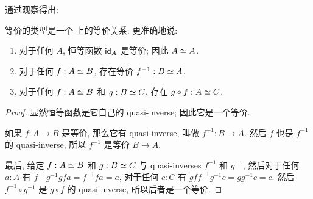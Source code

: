 通过观察得出:

\begin{lem}
    \label{thm:equiv-eqrel}
    等价的类型是一个 \type 上的等价关系.
    更准确地说:
    \begin{enumerate}
        \item 对于任何 $A$, 恒等函数 $\idfunc[A]$ 是等价; 因此 $\eqv A A$.
        \item 对于任何 $f:\eqv A B$, 存在等价 $f^{-1} : \eqv B A$.
        \item 对于任何 $f:\eqv A B$ 和 $g:\eqv B C$, 存在 $g\circ f : \eqv A C$.
    \end{enumerate}
\end{lem}
\begin{proof}
  显然恒等函数是它自己的 quasi-inverse; 因此它是一个等价.

  如果 $f:A\to B$ 是等价, 那么它有 quasi-inverse, 叫做 $f^{-1}:B\to A$.
  然后 $f$ 也是 $f^{-1}$ 的 quasi-inverse, 所以 $f^{-1}$ 是等价 $B\to A$.

  最后, 给定 $f:\eqv A B$ 和 $g:\eqv B C$ 与 quasi-inverses $f^{-1}$ 和 $g^{-1}$, 然后对于任何 $a:A$ 有 $f^{-1} g^{-1} g f a = f^{-1} f a = a$, 对于任何 $c:C$ 有 $g f f^{-1} g^{-1} c = g g^{-1} c = c$.
  然后 $f^{-1} \circ g^{-1}$ 是 $g\circ f$ 的 quasi-inverse, 所以后者是一个等价.
\end{proof}

%